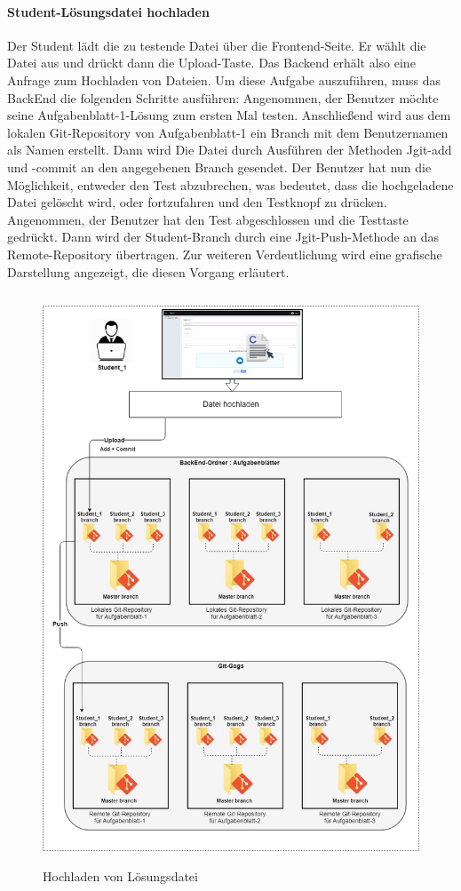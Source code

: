 \documentclass[apaper4,12p]{scrartcl}
\begin{document}
\paragraph{Student-Lösungsdatei hochladen}
Der Student lädt die zu testende Datei über die Frontend-Seite. Er wählt die Datei aus und drückt dann die Upload-Taste. Das Backend erhält also eine Anfrage zum Hochladen von Dateien. Um diese Aufgabe auszuführen, muss das BackEnd die folgenden Schritte ausführen: Angenommen, der Benutzer möchte seine Aufgabenblatt-1-Lösung zum ersten Mal testen. Anschließend wird aus dem lokalen Git-Repository von Aufgabenblatt-1 ein Branch mit dem Benutzernamen als Namen erstellt. Dann wird Die Datei durch Ausführen der Methoden Jgit-add und -commit an den angegebenen Branch gesendet. Der Benutzer hat nun die Möglichkeit, entweder den Test abzubrechen, was bedeutet, dass die hochgeladene Datei gelöscht wird, oder fortzufahren und den Testknopf zu drücken. Angenommen, der Benutzer hat den Test abgeschlossen und die Testtaste gedrückt. Dann wird der Student-Branch durch eine Jgit-Push-Methode an das Remote-Repository übertragen. Zur weiteren Verdeutlichung wird eine grafische Darstellung angezeigt, die diesen Vorgang erläutert.
\begin{figure}[h!]
	\begin{center}
		\includegraphics[width=15cm, height=17cm]{Loesungupload.jpg}
		\caption{Hochladen von Lösungsdatei} 
		\label{ Hochladen von Lösungsdatei } 
	\end{center}
\end{figure}
\end{document}
